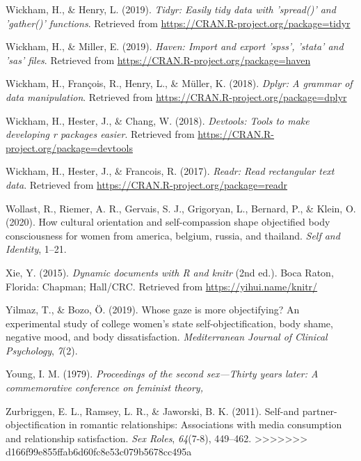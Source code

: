 \documentclass[
  man]{apa6}
\begin{document}
\hypertarget{ref-R-tidyr}{}
Wickham, H., \& Henry, L. (2019). \emph{Tidyr: Easily tidy data with
'spread()' and 'gather()' functions}. Retrieved from
\url{https://CRAN.R-project.org/package=tidyr}

\hypertarget{ref-R-haven}{}
Wickham, H., \& Miller, E. (2019). \emph{Haven: Import and export
'spss', 'stata' and 'sas' files}. Retrieved from
\url{https://CRAN.R-project.org/package=haven}

\hypertarget{ref-R-dplyr}{}
Wickham, H., François, R., Henry, L., \& Müller, K. (2018). \emph{Dplyr:
A grammar of data manipulation}. Retrieved from
\url{https://CRAN.R-project.org/package=dplyr}

\hypertarget{ref-R-devtools}{}
Wickham, H., Hester, J., \& Chang, W. (2018). \emph{Devtools: Tools to
make developing r packages easier}. Retrieved from
\url{https://CRAN.R-project.org/package=devtools}

\hypertarget{ref-R-readr}{}
Wickham, H., Hester, J., \& Francois, R. (2017). \emph{Readr: Read
rectangular text data}. Retrieved from
\url{https://CRAN.R-project.org/package=readr}

\hypertarget{ref-wollast2020cultural}{}
Wollast, R., Riemer, A. R., Gervais, S. J., Grigoryan, L., Bernard, P.,
\& Klein, O. (2020). How cultural orientation and self-compassion shape
objectified body consciousness for women from america, belgium, russia,
and thailand. \emph{Self and Identity}, 1--21.

\hypertarget{ref-R-knitr}{}
Xie, Y. (2015). \emph{Dynamic documents with R and knitr} (2nd ed.).
Boca Raton, Florida: Chapman; Hall/CRC. Retrieved from
\url{https://yihui.name/knitr/}

\hypertarget{ref-yilmaz2019whose}{}
Yilmaz, T., \& Bozo, Ö. (2019). Whose gaze is more objectifying? An
experimental study of college women's state self-objectification, body
shame, negative mood, and body dissatisfaction. \emph{Mediterranean
Journal of Clinical Psychology}, \emph{7}(2).

\hypertarget{ref-young1979}{}
Young, I. M. (1979). \emph{Proceedings of the second sex---Thirty years
later: A commemorative conference on feminist theory,}

\hypertarget{ref-zurbriggen2011self}{}
Zurbriggen, E. L., Ramsey, L. R., \& Jaworski, B. K. (2011). Self-and
partner-objectification in romantic relationships: Associations with
media consumption and relationship satisfaction. \emph{Sex Roles},
\emph{64}(7-8), 449--462.
>>>>>>> d166f99e855ffab6d60fc8e53c079b5678cc495a
\end{document}
